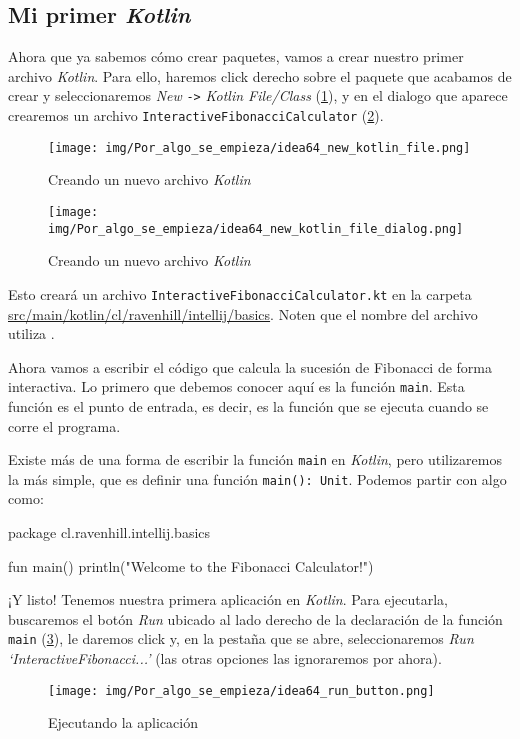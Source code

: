 
\subsection{Mi primer \textit{Kotlin}}
  Ahora que ya sabemos cómo crear paquetes, vamos a crear nuestro primer archivo \textit{Kotlin}.
  Para ello, haremos click derecho sobre el paquete que acabamos de crear y seleccionaremos
  \textit{New} \texttt{->} \textit{Kotlin File/Class} (\cref{fig:idea64_new_kotlin_file}), y en
  el dialogo que aparece crearemos un archivo \texttt{InteractiveFibonacciCalculator} 
  (\cref{fig:idea64_new_kotlin_file_dialog}).

  \begin{figure}[ht!]
    \centering
    \texttt{[image: img/Por\_algo\_se\_empieza/idea64\_new\_kotlin\_file.png]}
    \caption{Creando un nuevo archivo \textit{Kotlin}}
    \label{fig:idea64_new_kotlin_file}
  \end{figure}

  \begin{figure}[H]
    \centering
    \texttt{[image: img/Por\_algo\_se\_empieza/idea64\_new\_kotlin\_file\_dialog.png]}
    \caption{Creando un nuevo archivo \textit{Kotlin}}
    \label{fig:idea64_new_kotlin_file_dialog}
  \end{figure}

  Esto creará un archivo \texttt{InteractiveFibonacciCalculator.kt} en la carpeta
  \url{src/main/kotlin/cl/ravenhill/intellij/basics}.
  Noten que el nombre del archivo utiliza .\autocite{WhatPascalCase}

  Ahora vamos a escribir el código que calcula la sucesión de Fibonacci de forma interactiva.
  Lo primero que debemos conocer aquí es la función \texttt{main}.
  Esta función es el punto de entrada, es decir, es la función que se ejecuta cuando se corre el
  programa.

  Existe más de una forma de escribir la función \texttt{main} en \textit{Kotlin}, pero 
  utilizaremos la más simple, que es definir una función \texttt{main(): Unit}.
  Podemos partir con algo como:

  \begin{kotlin}
    package cl.ravenhill.intellij.basics

    fun main() {
      println("Welcome to the Fibonacci Calculator!")
    }
  \end{kotlin}

  ¡Y listo! 
  Tenemos nuestra primera aplicación en \textit{Kotlin}.
  Para ejecutarla, buscaremos el botón \textit{Run} ubicado al lado derecho de la declaración de 
  la función \texttt{main} (\cref{fig:idea64_run_button}), le daremos click y, en la pestaña que
  se abre, seleccionaremos \textit{Run `InteractiveFibonacci...'} (las otras opciones las 
  ignoraremos por ahora).

  \begin{figure}[ht!]
    \centering
    \texttt{[image: img/Por\_algo\_se\_empieza/idea64\_run\_button.png]}
    \caption{Ejecutando la aplicación}
    \label{fig:idea64_run_button}
  \end{figure}